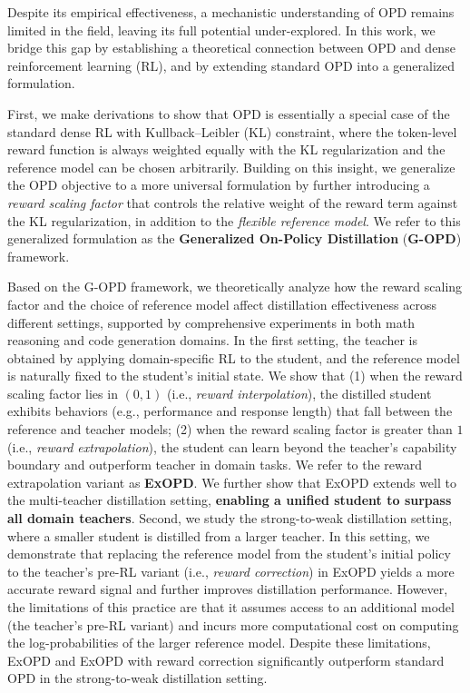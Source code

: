 \documentclass{article} %
\begin{document}
Despite its empirical effectiveness, a mechanistic understanding of OPD remains limited in the field, leaving its full potential under-explored. In this work, we bridge this gap by establishing a theoretical connection between OPD and dense reinforcement learning (RL), and by extending standard OPD into a generalized formulation.

First, we make derivations to show that OPD is essentially a special case of the standard dense RL with Kullback–Leibler (KL) constraint, where the token-level reward function is always weighted equally with the KL regularization and the reference model can be chosen arbitrarily. Building on this insight, we generalize the OPD objective to a more universal formulation by further introducing a \textit{reward scaling factor} that controls the relative weight of the reward term against the KL regularization, in addition to the \textit{flexible reference model}. We refer to this generalized formulation as the \textbf{Generalized On-Policy Distillation} (\textbf{G-OPD}) framework.

Based on the G-OPD framework, we theoretically analyze how the reward scaling factor and the choice of reference model affect distillation effectiveness across different settings, supported by comprehensive experiments in both math reasoning and code generation domains. 
In the first setting, the teacher is obtained by applying domain-specific RL to the student, and the reference model is naturally fixed to the student's initial state. We show that (1) when the reward scaling factor lies in $(0,1)$ (i.e., \textit{reward interpolation}), the distilled student exhibits behaviors (e.g., performance and response length) that fall between the reference and teacher models; (2) when the reward scaling factor is greater than $1$ (i.e., \textit{reward extrapolation}), the student can learn beyond the teacher's capability boundary and outperform teacher in domain tasks. We refer to the reward extrapolation variant as \textbf{ExOPD}. We further show that ExOPD extends well to the multi-teacher distillation setting, \textbf{enabling a unified student to surpass all domain teachers}. Second, we study the strong-to-weak distillation setting, where a smaller student is distilled from a larger teacher. In this setting, we demonstrate that replacing the reference model from the student's initial policy to the teacher's pre-RL variant (i.e., \emph{reward correction}) in ExOPD yields a more accurate reward signal and further improves distillation performance. However, the limitations of this practice are that it assumes access to an additional model (the teacher's pre-RL variant) and incurs more computational cost on computing the log-probabilities of the larger reference model. Despite these limitations, ExOPD and ExOPD with reward correction significantly outperform standard OPD in the strong-to-weak distillation setting.
\end{document}
